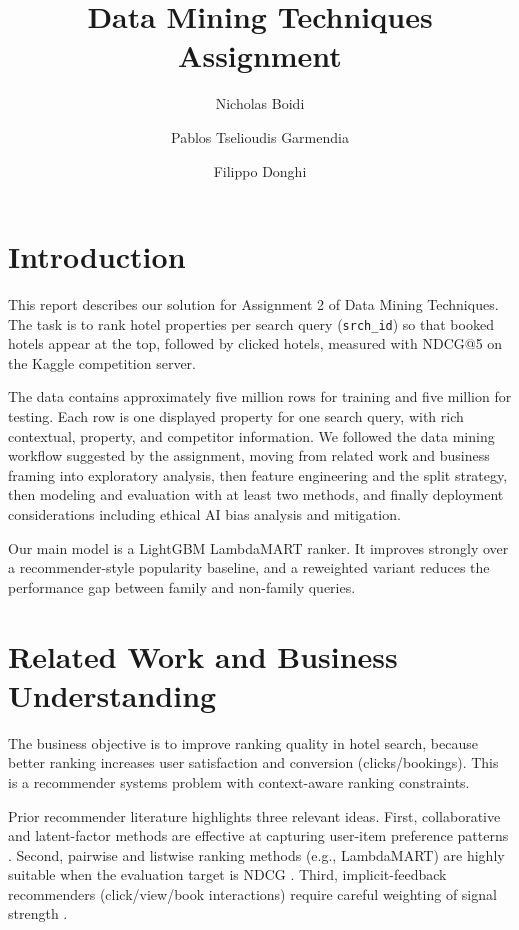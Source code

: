 \documentclass{llncs}
\begin{document}
\title{Data Mining Techniques Assignment}

\author{Nicholas Boidi \and Pablos Tselioudis Garmendia \and Filippo Donghi}


\maketitle


\section{Introduction}
\label{sec:intro}

This report describes our solution for Assignment 2 of Data Mining Techniques. The task is to rank hotel properties per search query (\texttt{srch\_id}) so that booked hotels appear at the top, followed by clicked hotels, measured with NDCG@5 on the Kaggle competition server.

The data contains approximately five million rows for training and five million for testing. Each row is one displayed property for one search query, with rich contextual, property, and competitor information. We followed the data mining workflow suggested by the assignment, moving from related work and business framing into exploratory analysis, then feature engineering and the split strategy, then modeling and evaluation with at least two methods, and finally deployment considerations including ethical AI bias analysis and mitigation.

Our main model is a LightGBM LambdaMART ranker. It improves strongly over a recommender-style popularity baseline, and a reweighted variant reduces the performance gap between family and non-family queries.

\section{Related Work and Business Understanding}
\label{sec:related}

The business objective is to improve ranking quality in hotel search, because better ranking increases user satisfaction and conversion (clicks/bookings). This is a recommender systems problem with context-aware ranking constraints.

Prior recommender literature highlights three relevant ideas. First, collaborative and latent-factor methods are effective at capturing user-item preference patterns \cite{koren2009matrix}. Second, pairwise and listwise ranking methods (e.g., LambdaMART) are highly suitable when the evaluation target is NDCG \cite{burges2010ranknet}. Third, implicit-feedback recommenders (click/view/book interactions) require careful weighting of signal strength \cite{rendle2009bpr}.
\end{document}
